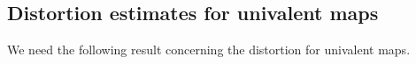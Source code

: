 \documentclass[11pt]{article}
\theoremstyle{definition}
\theoremstyle{remark}
\newtheorem{remark}[thm]{Remark}
\theoremstyle{plain}
\begin{document}
%	
%	

\subsection{Distortion estimates for univalent maps}

We need the following result concerning the distortion for univalent maps.
\end{document}
